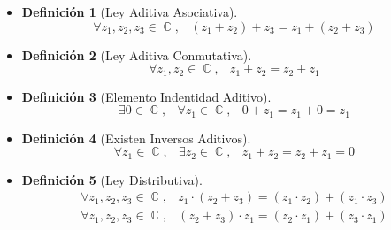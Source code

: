 \documentclass[12pt, fleqn]{report}                             %
\def \Eq {equation}                                             %
\newenvironment{MultiLineEquation}[1]                           %
        {\begin{\Eq}\begin{alignedat}{#1}}                          %
        {\end{alignedat}\end{\Eq}}                                  %
\DeclareMathOperator \Space     {\quad}                         %
\DeclareMathOperator \MiniSpace {\;}                            %
\newtheorem{Definition}     {Definición}[section]               %
\theoremstyle{break}                                            %
\DeclareMathOperator \Complexs     {\mathbb{C}}                 %
\begin{document}
            \begin{itemize}
                    
                \item 
                    \begin{Definition}[Ley Aditiva Asociativa]
                        \begin{equation}
                            \forall z_1, z_2, z_3 \in \Complexs, \MiniSpace
                                (z_1 + z_2) + z_3 = z_1 + (z_2 + z_3)
                        \end{equation}
                    \end{Definition}

                \item
                    \begin{Definition}[Ley Aditiva Conmutativa]
                        \begin{equation}
                            \forall z_1, z_2 \in \Complexs, \MiniSpace z_1 + z_2 =  z_2 + z_1
                        \end{equation}
                    \end{Definition}

                \item
                    \begin{Definition}[Elemento Indentidad Aditivo]
                        \begin{equation}
                            \exists 0 \in \Complexs, \MiniSpace
                                \forall z_1 \in \Complexs, \MiniSpace 0 + z_1 = z_1  + 0 = z_1
                        \end{equation}
                    \end{Definition}


                \item
                    \begin{Definition}[Existen Inversos Aditivos]
                        \begin{equation}
                            \forall z_1 \in \Complexs, \MiniSpace
                                \exists z_2 \in \Complexs, \MiniSpace
                                    z_1  + z_2 = z_2 + z_1 = 0
                        \end{equation}
                    \end{Definition}

                \item
                    \begin{Definition}[Ley Distributiva]
                        \begin{MultiLineEquation}{1}
                            \forall z_1, z_2, z_3 \in \Complexs, \MiniSpace
                                z_1 \cdot (z_2  + z_3) = (z_1  \cdot z_2) + (z_1  \cdot z_3)        \\
                            \forall z_1, z_2, z_3 \in \Complexs, \MiniSpace
                                (z_2 + z_3) \cdot z_1  = (z_2 \cdot z_1) + (z_3  \cdot z_1)
                        \end{MultiLineEquation}
                    \end{Definition}



\end{itemize}
\end{document}
